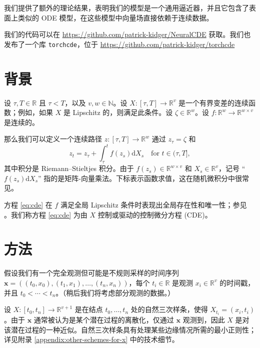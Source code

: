 \documentclass{ctexart}
\theoremstyle{plain}
\theoremstyle{definition}
\newcommand{\reals}{\mathbb{R}}
\newcommand{\naturals}{\mathbb{N}}
\begin{document}
	我们提供了额外的理论结果，表明我们的模型是一个通用逼近器，并且它包含了表面上类似的 ODE 模型，在这些模型中向量场直接依赖于连续数据。
	
	我们的代码可以在 \url{https://github.com/patrick-kidger/NeuralCDE} 获取。我们也发布了一个库 \texttt{torchcde}，位于 \url{https://github.com/patrick-kidger/torchcde}
	
	\section{背景}
	设 $\tau, T \in \reals$ 且 $\tau < T$，以及 $v, w \in \naturals$。设 $X \colon [\tau, T] \to \reals^v$ 是一个有界变差的连续函数；例如，如果 $X$ 是 Lipschitz 的，则满足此条件。设 $\zeta \in \reals^w$。设 $f \colon \reals^w \to \reals^{w \times v}$ 是连续的。
	
	那么我们可以定义一个连续路径 $z \colon [\tau, T] \to \reals^w$ 通过 $z_\tau = \zeta$ 和
\begin{equation}\label{eq:cde}
	z_t = z_\tau + \int_\tau^t f(z_s) \mathrm{d} X_s\quad\text{for $t \in (\tau, T]$},
\end{equation}
	其中积分是 Riemann--Stieltjes 积分。由于 $f(z_s) \in \reals^{w \times v}$ 和 $X_s \in \reals^v$，记号 ``$f(z_s) \mathrm{d}X_s$'' 指的是矩阵-向量乘法。下标表示函数求值，这在随机微积分中很常见。
	
	方程 \eqref{eq:cde} 在 $f$ 满足全局 Lipschitz 条件时表现出全局存在性和唯一性；参见 \cite[Theorem 1.3]{levy-lyons}。我们称方程 \eqref{eq:cde} 为由 $X$ 控制或驱动的控制微分方程 (CDE)。
	
	
	\section{方法}	
	假设我们有一个完全观测但可能是不规则采样的时间序列 $\mathbf{x} = ((t_0, x_0), (t_1, x_1), \ldots, (t_n, x_n))$，每个 $t_i \in \reals$ 是观测 $x_i \in \reals^v$ 的时间戳，并且 $t_0 < \cdots < t_n$。（稍后我们将考虑部分观测的数据。）
	
	设 $X \colon [t_0, t_n] \to \reals^{v + 1}$ 是在结点 $t_0, \ldots, t_n$ 处的自然三次样条，使得 $X_{t_i} = (x_i, t_i)$。由于 $\mathbf{x}$ 通常被认为是某个潜在过程的离散化，仅通过 $\mathbf{x}$ 观测到，因此 $X$ 是对该潜在过程的一种近似。自然三次样条具有处理某些边缘情况所需的最小正则性；详见附录 \ref{appendix:other-schemes-for-x} 中的技术细节。
		
\end{document}
